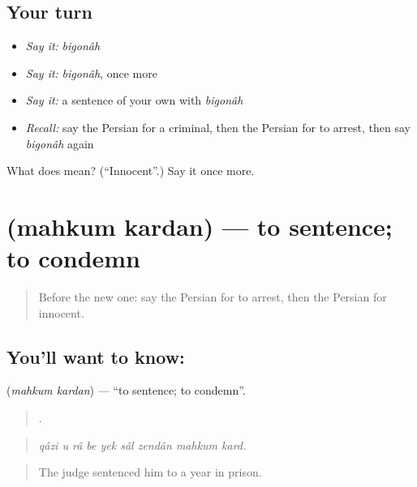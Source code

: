 \subsection*{Your turn}
\begin{itemize}
\raggedright
  \item \emph{Say it:} \emph{bigonâh}
  \item \emph{Say it:} \emph{bigonâh}, once more
  \item \emph{Say it:} a sentence of your own with \emph{bigonâh}
  \item \emph{Recall:} say the Persian for a criminal, then the Persian for to arrest, then say \emph{bigonâh} again
\end{itemize}

\begin{tcolorbox}[breakable,colback=teal!4,colframe=teal!35!black,title={Before you move on}]
What does   mean? (\textquotedblleft{}Innocent\textquotedblright{}.) Say it once more.
\end{tcolorbox}
\section[\texorpdfstring{\fa{محکوم} \fa{کردن} (mahkum kardan)}{محکوم کردن (mahkum kardan)}]{  (mahkum kardan) — to sentence; to condemn}

\label{lesson:FA-C407-mahkum-kardan}



\begin{quote}
Before the new one: say the Persian for to arrest, then the Persian for innocent.
\end{quote}

\subsection*{You'll want to know:  }
\textbf{ } (\emph{mahkum kardan}) — \textquotedblleft{}to sentence; to condemn\textquotedblright{}.

\begin{quote}
        .
\end{quote}

\begin{quote}
\emph{qâzi u râ be yek sâl zendân mahkum kard.}
\end{quote}

\begin{quote}
The judge sentenced him to a year in prison.
\end{quote}

